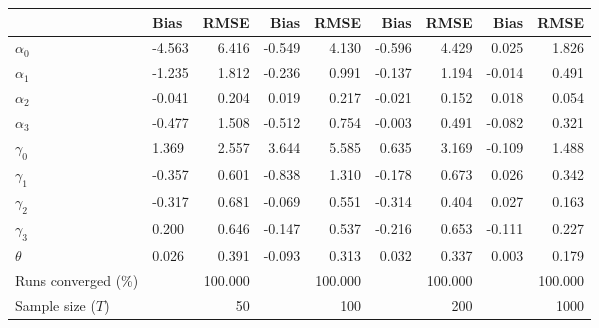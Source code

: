 
\begin{tabular}[t]{llrrrrrrr}
\toprule
  & Bias & RMSE & Bias & RMSE & Bias & RMSE & Bias & RMSE\\
\midrule
$\alpha_{0}$ & -4.563 & 6.416 & -0.549 & 4.130 & -0.596 & 4.429 & 0.025 & 1.826\\
$\alpha_{1}$ & -1.235 & 1.812 & -0.236 & 0.991 & -0.137 & 1.194 & -0.014 & 0.491\\
$\alpha_{2}$ & -0.041 & 0.204 & 0.019 & 0.217 & -0.021 & 0.152 & 0.018 & 0.054\\
$\alpha_{3}$ & -0.477 & 1.508 & -0.512 & 0.754 & -0.003 & 0.491 & -0.082 & 0.321\\
$\gamma_{0}$ & 1.369 & 2.557 & 3.644 & 5.585 & 0.635 & 3.169 & -0.109 & 1.488\\
$\gamma_{1}$ & -0.357 & 0.601 & -0.838 & 1.310 & -0.178 & 0.673 & 0.026 & 0.342\\
$\gamma_{2}$ & -0.317 & 0.681 & -0.069 & 0.551 & -0.314 & 0.404 & 0.027 & 0.163\\
$\gamma_{3}$ & 0.200 & 0.646 & -0.147 & 0.537 & -0.216 & 0.653 & -0.111 & 0.227\\
$\theta$ & 0.026 & 0.391 & -0.093 & 0.313 & 0.032 & 0.337 & 0.003 & 0.179\\
Runs converged (\%) &  & 100.000 &  & 100.000 &  & 100.000 &  & 100.000\\
Sample size ($T$) &  & 50 &  & 100 &  & 200 &  & 1000\\
\bottomrule
\end{tabular}
